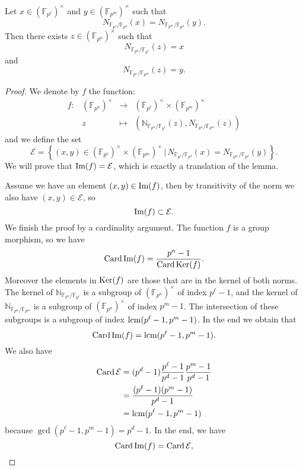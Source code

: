 \documentclass[a4paper,11pt]{article}
\begin{document}
\begin{lm}
  \label{lm:norms}
  Let $x\in (\mathbb{F}_{p^\ell})^\times$ and $y\in(\mathbb{F}_{p^m})^\times$ such that 
  \[
    N_{\mathbb{F}_{p^\ell}/\mathbb{F}_{p^d}}(x)=N_{\mathbb{F}_{p^m}/\mathbb{F}_{p^d}}(y).
  \]
  Then there exists $z\in(\mathbb{F}_{p^n})^\times$ such that
  \[
    N_{\mathbb{F}_{p^n}/\mathbb{F}_{p^\ell}}(z)=x
  \]
  and
  \[
    N_{\mathbb{F}_{p^n}/\mathbb{F}_{p^m}}(z)=y.
  \]
\end{lm}
\begin{proof}
  We denote by $f$ the function:
\[
\begin{array}{cccc}
  f: & (\mathbb{F}_{p^n})^\times & \to &
  (\mathbb{F}_{p^\ell})^\times\times(\mathbb{F}_{p^m})^\times\\
  & z & \mapsto & (\mathbb{N}_{\mathbb{F}_{p^n}/\mathbb{F}_{p^\ell}}(z),
  N_{\mathbb{F}_{p^n}/\mathbb{F}_{p^m}}(z))
\end{array}
\]
and we define the set
\[
  \mathcal E = \left\{ (x, y)\in
    (\mathbb{F}_{p^\ell})^\times\times(\mathbb{F}_{p^m})^\times\,|\,N_{\mathbb{F}_{p^\ell}/\mathbb{F}_{p^d}}(x)=N_{\mathbb{F}_{p^m}/\mathbb{F}_{p^d}}(y)\right\}.
\]
We will prove that $\operatorname{Im}(f)=\mathcal E$, which is exactly a translation of the
lemma.

Assume we have an element $(x,y)\in\operatorname{Im}(f)$, then by transitivity of the norm we
also have $(x,y)\in\mathcal E$, so 
\[
  \operatorname{Im}(f)\subset\mathcal E.
\]
We finish the proof by a cardinality argument. The function $f$ is a group
morphism, so we have 
\[
  \operatorname{Card}\operatorname{Im}(f)=\frac{p^{n}-1}{\operatorname{Card}\operatorname{Ker}(f)}.
\]
Moreover the elements in $\operatorname{Ker}(f)$ are those that are in the kernel of both
norms. The kernel of $\mathbb{N}_{\mathbb{F}_{p^n}/\mathbb{F}_{p^\ell}}$ is a
subgroup of $(\mathbb{F}_{p^n})^\times$ of index $p^{\ell}-1$, and the kernel of
$\mathbb{N}_{\mathbb{F}_{p^n}/\mathbb{F}_{p^m}}$ is a
subgroup of $(\mathbb{F}_{p^n})^\times$ of index $p^{m}-1$. The intersection of
these subgroups is a subgroup of index $\operatorname{lcm}(p^{\ell}-1, p^m-1)$. In the end we
obtain that
\[
  \operatorname{Card}\operatorname{Im}(f) = \operatorname{lcm}(p^\ell-1, p^m-1).
\]
We also have 
\begin{align*}
  \operatorname{Card}\mathcal E &= (p^{d}-1)\frac{p^\ell-1}{p^d-1}\frac{p^m-1}{p^d-1}\\
  &= \frac{(p^\ell-1)(p^m-1)}{p^d-1}\\
  &= \operatorname{lcm}(p^\ell-1, p^m-1)
\end{align*}
because $\gcd(p^\ell-1, p^m-1)=p^d-1$. In the end, we have 
\[
  \operatorname{Card}\operatorname{Im}(f)=\operatorname{Card}\mathcal E,
\]

\end{proof}
\end{document}
